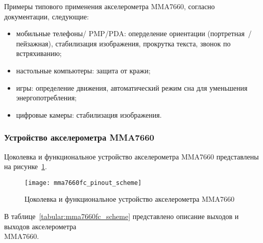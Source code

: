 \documentclass[document.tex]{subfiles}
\begin{document}
\noindent
Примеры типового применения акселерометра MMA7660, согласно докумен\-тации, следующие:
\begin{itemize} 
	\item мобильные телефоны/ PMP/PDA: оперделение ориентации (портретная~/ пейзажная), стабилизация изображения, прокрутка текста, звонок по встря\-хиванию;
	\item настольные компьютеры: защита от кражи;
	\item игры: определение движения, автоматический режим сна для уменьшения энерго\-потребления;
	\item цифровые камеры: стабилизация изображения. \cite{accelerometer_mma7660}
\end{itemize}

\clearpage
\subsubsection{Устройство акселерометра MMA7660}
Цоколевка и функциональное устройство акселерометра MMA7660 пред\-ставлены на ри\-сунке~\ref{fig:mma7660fc_pinout_scheme}.

\begin{figure}[h]
\centering
\texttt{[image: mma7660fc\_pinout\_scheme]}
\caption{Цоколевка и функциональное устройство акселерометра MMA7660}
\label{fig:mma7660fc_pinout_scheme}
\end{figure}

В таблице~\ref{tabular:mma7660fc_scheme} представлено описание выходов и выходов акселерометра \\ MMA7660. 

\begin{table}[h]
\medskip
{}
\medskip
\caption{Общие характеристики цифровых акселерометров}
\label{tabular:mma7660fc_scheme}
\end{table}
\end{document}
